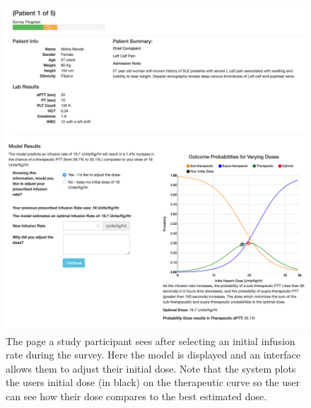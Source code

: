 \documentclass[12pt,a4paper,]{report}
\begin{document}
\begin{figure}[H]
\noindent
\includegraphics[width=1\textwidth]{source/figures/part3_ii.png}
\caption{\label{fig:part3_ii}The page a study participant sees after selecting an initial infusion rate during the survey. Here the model is displayed and an interface allows them to adjust their initial dose. Note that the system plots the users initial dose (in black) on the therapeutic curve so the user can see how their dose compares to the best estimated dose.}
\end{figure}
\end{document}
